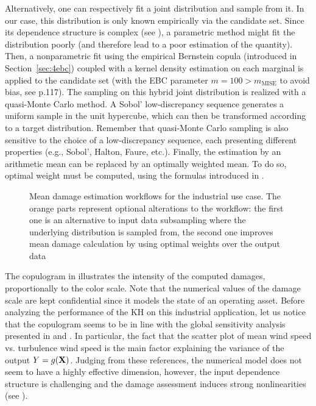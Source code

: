 Alternatively, one can respectively fit a joint distribution and sample from it. 
In our case, this distribution is only known empirically via the candidate set. 
Since its dependence structure is complex (see ), a parametric method might fit the distribution poorly (and therefore lead to a poor estimation of the quantity). 
Then, a nonparametric fit using the empirical Bernstein copula (introduced in Section~\ref{sec:4ebc}) coupled with a kernel density estimation on each marginal is applied to the candidate set (with the EBC parameter $m=100 > m_{\mbox{MISE}}$ to avoid bias, see \citet{lasserre_2022} p.117). 
The sampling on this hybrid joint distribution is realized with a quasi-Monte Carlo method. 
A Sobol' low-discrepancy sequence generates a uniform sample in the unit hypercube, which can then be transformed according to a target distribution. 
Remember that quasi-Monte Carlo sampling is also sensitive to the choice of a low-discrepancy sequence, each presenting different properties (e.g., Sobol', Halton, Faure, etc.). 
Finally, the estimation by an arithmetic mean can be replaced by an optimally weighted mean. 
To do so, optimal weight must be computed, using the formulas introduced in .

\begin{figure}[!h]
    \centering
    
    \caption{Mean damage estimation workflows for the industrial use case. 
    The orange parts represent optional alterations to the workflow: 
    the first one is an alternative to input data subsampling where the underlying distribution is sampled from, 
    the second one improves mean damage calculation by using optimal weights over the output data}
    \label{fig:sampling_diagram}
\end{figure}


The copulogram in  illustrates the intensity of the computed damages, proportionally to the color scale. 
Note that the numerical values of the damage scale are kept confidential since it models the state of an operating asset.
Before analyzing the performance of the KH on this industrial application, let us notice that the copulogram  seems to be in line with the global sensitivity analysis presented in \cite{murcia_dimitrov_2018} and \cite{li_zhan_2020}. 
In particular, the fact that the scatter plot of mean wind speed vs. turbulence wind speed is the main factor explaining the variance of the output $Y=g({\bf X})$. 
Judging from these references, the numerical model does not seem to have a highly effective dimension, however, the input dependence structure is challenging and the damage assessment induces strong nonlinearities (see ). 

